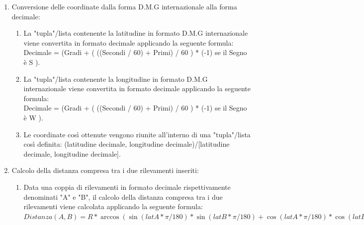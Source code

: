 \documentclass{article}
\begin{document}
\begin{enumerate}
	\item Conversione delle coordinate dalla forma D.M.G internazionale alla forma decimale:
	\begin{enumerate}
		\item La "tupla"/lista contenente la latitudine in formato D.M.G internazionale viene convertita in formato decimale applicando la seguente formula: \\Decimale = (Gradi + ( ((Secondi / 60) + Primi) / 60 ) * (-1) se il Segno è  S ). 
		\item La "tupla"/lista contenente la longitudine in formato D.M.G internazionale viene convertita in formato decimale applicando la seguente formula: \\Decimale = (Gradi + ( ((Secondi / 60) + Primi) / 60 ) * (-1) se il Segno è  W ).
		\item Le coordinate così ottenute vengono riunite all'interno di una "tupla"/lista così definita: (latitudine decimale, longitudine decimale)/[latitudine decimale, longitudine decimale].
	\end{enumerate}

	\item Calcolo della distanza compresa tra i due rilevamenti inseriti: 
	\begin{enumerate}
		\item Data una coppia di rilevamenti in formato decimale rispettivamente denominati "A" e "B", il calcolo della distanza compresa tra i due rilevamenti viene calcolata applicando la seguente formula: \\$Distanza(A, B) = R * \arccos(\sin(latA * \pi / 180) * \sin(latB * \pi / 180) + \cos(latA * \pi / 180) * \cos(latB * \pi / 180) * \cos((lonA - lonB) * \pi / 180)). $
	\end{enumerate}


\end{enumerate}
\end{document}
